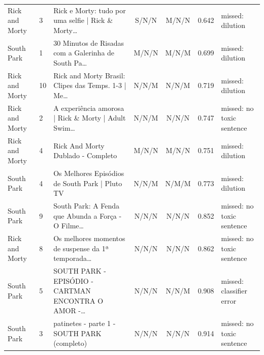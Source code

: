 \begin{table}[!t]
\begin{tabular}{@{}llp{}cccl@{}}
Rick and Morty & 3 & Rick e Morty: tudo por uma selfie | Rick \& Morty… & S/N/N & M/N/N & 0.642 & missed: dilution \\
South Park & 1 & 30 Minutos de Risadas com a Galerinha de South Pa… & M/N/N & M/N/M & 0.699 & missed: dilution \\
Rick and Morty & 10 & Rick and Morty Brasil: Clipes das Temps. 1-3 | Me… & N/N/M & N/N/M & 0.719 & missed: dilution \\
Rick and Morty & 2 & A experiência amorosa | Rick \& Morty | Adult Swim… & N/N/M & N/N/N & 0.747 & missed: no toxic sentence \\
Rick and Morty & 4 & Rick And Morty Dublado - Completo & M/N/N & M/N/N & 0.751 & missed: dilution \\
South Park & 4 & Os Melhores Episódios de South Park | Pluto TV & N/N/M & N/M/M & 0.773 & missed: dilution \\
South Park & 9 & South Park: A Fenda que Abunda a Força - O Filme… & N/N/N & N/N/N & 0.852 & missed: no toxic sentence \\
Rick and Morty & 8 & Os melhores momentos de suspense da 1ª temporada… & N/N/N & N/N/N & 0.862 & missed: no toxic sentence \\
South Park & 5 & SOUTH PARK - EPISÓDIO - CARTMAN ENCONTRA O AMOR -… & N/N/N & N/N/M & 0.908 & missed: classifier error \\
South Park & 3 & patinetes - parte 1 - SOUTH PARK (completo) & N/N/N & N/N/N & 0.914 & missed: no toxic sentence \\
\bottomrule
\end{tabular}
\end{table}
